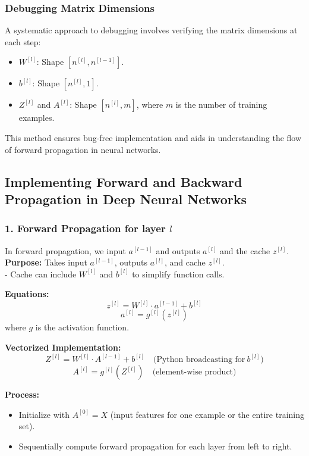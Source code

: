 \documentclass[letterpaper,12pt,notitlepage,twoside]{report}
\begin{document}
\subsubsection*{Debugging Matrix Dimensions}

A systematic approach to debugging involves verifying the matrix dimensions at each step:
\begin{itemize}
    \item \( W^{[l]} \): Shape \( [n^{[l]}, n^{[l-1]}] \).
    \item \( b^{[l]} \): Shape \( [n^{[l]}, 1] \).
    \item \( Z^{[l]} \) and \( A^{[l]} \): Shape \( [n^{[l]}, m] \), where \( m \) is the number of training examples.
\end{itemize}

This method ensures bug-free implementation and aids in understanding the flow of forward propagation in neural networks.


\subsection{Implementing Forward and Backward Propagation in Deep Neural Networks}

\subsubsection{1. Forward Propagation for layer $l$}
In forward propagation, we input \(a^{[l-1]}\) and outputs \(a^{[l]}\) and the cache \(z^{[l]}\). \\
\textbf{Purpose:} Takes input \(a^{[l-1]}\), outputs \(a^{[l]}\), and cache \(z^{[l]}\).  \\
- Cache can include \(W^{[l]}\) and \(b^{[l]}\) to simplify function calls.

\textbf{Equations:}
\[
z^{[l]} = W^{[l]} \cdot a^{[l-1]} + b^{[l]}
\]
\[
a^{[l]} = g^{[l]}(z^{[l]})
\]
where \(g\) is the activation function.

\textbf{Vectorized Implementation:}
\[
Z^{[l]} = W^{[l]} \cdot A^{[l-1]} + b^{[l]} \quad \text{(Python broadcasting for}~b^{[l]})
\]
\[
A^{[l]} = g^{[l]}(Z^{[l]}) \quad \text{(element-wise product)}
\]

\textbf{Process:}
\begin{itemize}[nosep]
\item Initialize with \(A^{[0]} = X\) (input features for one example or the entire training set).
\item Sequentially compute forward propagation for each layer from left to right.
\end{itemize}
\end{document}
